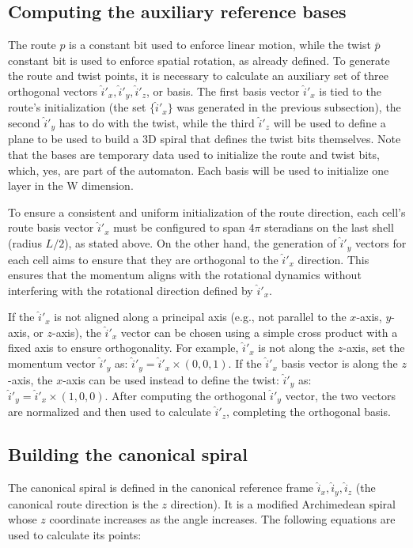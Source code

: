 \documentclass[12pt,english]{article}
\begin{document}
\subsection{Computing the auxiliary reference bases}
The route $p$ is a constant bit used to enforce linear motion, while the twist $\bar{p}$ constant bit is used to enforce spatial rotation, as already defined. To generate the route and twist points, it is necessary to calculate an auxiliary set of three orthogonal vectors $\hat{i}'_x,\hat{i}'_y,\hat{i}'_z$, or basis. The first basis vector $\hat{i}'_x$ is tied to the route's initialization (the set $\{\hat{i}'_x\}$ was generated in the previous subsection), the second $\hat{i}'_y$ has to do with the twist, while the third $\hat{i}'_z$ will be used to define a plane to be used to build a 3D spiral that defines the twist bits themselves. Note that the bases are temporary data used to initialize the route and twist bits, which, yes, are part of the automaton. Each basis will be used to initialize one layer in the W dimension.

To ensure a consistent and uniform initialization of the route direction, each cell's route basis vector $\hat{i}'_x$ must be configured to span $4\pi$ steradians on the last shell (radius $L/2$), as stated above. On the other hand, the generation of $\hat{i}'_y$ vectors for each cell aims to ensure that they are orthogonal to the $\hat{i}'_x$ direction. This ensures that the momentum aligns with the rotational dynamics without interfering with the rotational direction defined by $\hat{i}'_x$.

If the $\hat{i}'_x$ is not aligned along a principal axis (e.g., not parallel to the $x$-axis, $y$-axis, or $z$-axis), the $\hat{i}'_x$ vector can be chosen using a simple cross product with a fixed axis to ensure orthogonality. For example, $\hat{i}'_x$ is not along the $z$-axis, set the momentum vector $\hat{i}'_y$ as: $\hat{i}'_y=\hat{i}'_x\times(0,0,1)$. If the $\hat{i}'_x$ basis vector is along the $z$-axis, the $x$-axis can be used instead to define the twist: $\hat{i}'_y$ as: $\hat{i}'_y=\hat{i}'_x\times(1,0,0)$. After computing the orthogonal $\hat{i}'_y$ vector, the two vectors are normalized and then used to calculate $\hat{i}'_z$, completing the orthogonal basis.

\subsection{Building the canonical spiral}

The canonical spiral is defined in the canonical reference frame $\hat{i}_x, \hat{i}_y, \hat{i}_z$ (the canonical route direction is the $z$ direction). It is a modified Archimedean spiral whose $z$ coordinate increases as the angle increases. The following equations are used to calculate its points:
\end{document}
